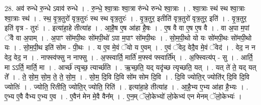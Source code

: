 \documentclass[17pt]{extarticle}
\begin{document}
28. अव॑ रुन्धे रु॒न्धे ऽवाव॑ रुन्धे । . रु॒न्धे॒ श्वा॒त्राः श्वा॒त्रा रु॑न्धे रुन्धे श्वा॒त्राः । . श्वा॒त्राः स्थ॑ स्थ श्वा॒त्राः श्वा॒त्राः स्थ॑ । . स्थ॒ वृ॒त्र॒तुरो॑ वृत्र॒तुरः॑ स्थ स्थ वृत्र॒तुरः॑ । . वृ॒त्र॒तुर॒ इतीति॑ वृत्र॒तुरो॑ वृत्र॒तुर॒ इति॑ । . वृ॒त्र॒तुर॒ इति॑ वृत्र - तुरः॑ । . इत्या॑हा॒हे तीत्या॑ह । . आ॒है॒ष ए॒ष आ॑हा है॒षः । . ए॒ष वै वा ए॒ष ए॒ष वै । . वा अ॒पा म॒पां ॅवै वा अ॒पाम् । . अ॒पाꣳ सो॑मपी॒थः सो॑मपी॒थो॑ ऽपा म॒पाꣳ सो॑मपी॒थः । . सो॒म॒पी॒थो यो यः सो॑मपी॒थः सो॑मपी॒थो यः । . सो॒म॒पी॒थ इति॑ सोम - पी॒थः । . य ए॒व मे॒वं ॅयो य ए॒वम् । . ए॒वं ॅवेद॒ वेदै॒व मे॒वं ॅवेद॑ । . वेद॒ न न वेद॒ वेद॒ न । . नाफ्स्व॑फ्सु न नाफ्सु । . अ॒फ्स्वार्ति॒ मार्ति॑ म॒फ्स्व॑ फ्स्वार्ति᳚म् । . अ॒फ्स्वित्य॑प् - सु । . आर्ति॒ मा ऽऽर्ति॒ मार्ति॒ मा । . आर्च्छ॑ त्यृच्छ॒ त्यार्च्छ॑ति । . ऋ॒च्छ॒ति॒ यद् यदृ॑च्छ त्यृच्छति॒ यत् । . यत् ते॑ ते॒ यद् यत् ते᳚ । . ते॒ सो॒म॒ सो॒म॒ ते॒ ते॒ सो॒म॒ । . सो॒म॒ दि॒वि दि॒वि सो॑म सोम दि॒वि । . दि॒वि ज्योति॒र् ज्योति॑र् दि॒वि दि॒वि ज्योतिः॑ । . ज्योति॒ रितीति॒ ज्योति॒र् ज्योति॒ रिति॑ । . इत्या॑हा॒हे तीत्या॑ह । . आ॒है॒भ्य ए॒भ्य आ॑हा है॒भ्यः । . ए॒भ्य ए॒वै वैभ्य ए॒भ्य ए॒व । . ए॒वैन॑ मेन मे॒वै वैन᳚म् । . ए॒न॒म् ॅलो॒केभ्यो॑ लो॒केभ्य॑ एन मेनम् ॅलो॒केभ्यः॑ । \newline
\end{document}
